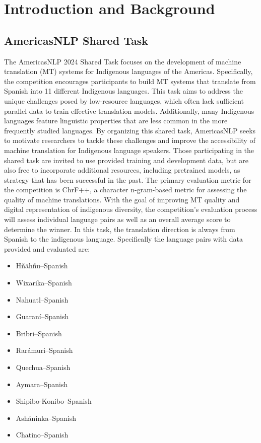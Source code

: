 \newcommand\tab[1][1cm]{\hspace*{#1}}
\chapter{Introduction and Background}
\label{chap:introduction}

\section{AmericasNLP Shared Task}
The AmericasNLP 2024 Shared Task \cite{americasnlp2024} focuses on the development of   machine translation (MT) systems for Indigenous languages of the Americas. Specifically, the competition encourages participants to build MT systems that translate from Spanish into 11 different Indigenous languages. This task aims to address the unique challenges posed by low-resource languages, which often lack sufficient parallel data to train effective translation models. Additionally, many Indigenous languages feature linguistic properties that are less common in the more frequently studied languages. By organizing this shared task, AmericasNLP seeks to motivate researchers to tackle these challenges and improve the accessibility of machine translation for Indigenous language speakers.
Those participating in the shared task are invited to use provided training and development data, but are also free to incorporate additional resources, including pretrained models, as strategy that has been successful in the past. The primary evaluation metric for the competition is ChrF++, a character n-gram-based metric for assessing the quality of machine translations. With the goal of improving MT quality and digital representation of indigenous diversity,  the competition's evaluation process will assess individual language pairs as well as an overall average score to determine the winner. In this task, the translation direction is always from Spanish to the indigenous language. Specifically the language pairs with data provided and evaluated are: 
\begin{itemize}
    \item Hñähñu–Spanish
    \item Wixarika–Spanish
    \item Nahuatl–Spanish
    \item Guaraní–Spanish
    \item Bribri–Spanish
    \item Rarámuri–Spanish
    \item Quechua–Spanish
    \item Aymara–Spanish
    \item Shipibo-Konibo–Spanish
    \item Asháninka–Spanish
    \item Chatino–Spanish    
\end{itemize}


